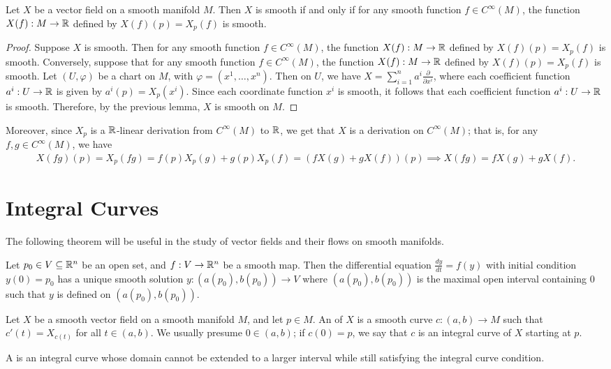 \begin{proposition}
    Let $X$ be a vector field on a smooth manifold $M$. Then $X$ is smooth if and only if for any smooth function $f \in C^{\infty}(M)$, the function $X(f):M \to \mathbb{R}$ defined by $X(f)(p) = X_{p}(f)$ is smooth.
\end{proposition}
\begin{proof}
    Suppose $X$ is smooth. Then for any smooth function $f \in C^{\infty}(M)$, the function $X(f):M \to \mathbb{R}$ defined by $X(f)(p) = X_{p}(f)$ is smooth. Conversely, suppose that for any smooth function $f \in C^{\infty}(M)$, the function $X(f):M \to \mathbb{R}$ defined by $X(f)(p) = X_{p}(f)$ is smooth. Let $(U,\varphi)$ be a chart on $M$, with $\varphi = (x^{1},\ldots,x^{n})$. Then on $U$, we have $X = \sum_{i=1}^{n} a^{i} \frac{\partial}{\partial x^{i}}$, where each coefficient function $a^{i}:U \to \mathbb{R}$ is given by $a^{i}(p) = X_{p}(x^{i})$. Since each coordinate function $x^{i}$ is smooth, it follows that each coefficient function $a^{i}:U \to \mathbb{R}$ is smooth. Therefore, by the previous lemma, $X$ is smooth on $M$.
\end{proof}
Moreover, since $X_{p}$ is a $\mathbb{R}$-linear derivation from $C^{\infty}(M)$ to $\mathbb{R}$, we get that $X$ is a derivation on $C^{\infty}(M)$; that is, for any $f,g \in C^{\infty}(M)$, we have
\begin{align}
    X(fg)(p) = X_{p}(fg) = f(p)X_{p}(g) + g(p)X_{p}(f) = (fX(g) + gX(f))(p) \implies X(fg) = fX(g) + gX(f).
\end{align}


\section{Integral Curves}
The following theorem will be useful in the study of vector fields and their flows on smooth manifolds.
\begin{theorem}
    Let $p_{0} \in V \subseteq \mathbb{R}^{n}$ be an open set, and $f:V \to \mathbb{R}^{n}$ be a smooth map. Then the differential equation $\frac{dy}{dt} = f(y)$ with initial condition $y(0) = p_{0}$ has a unique smooth solution $y:(a(p_{0}),b(p_{0})) \to V$ where $(a(p_{0}),b(p_{0}))$ is the maximal open interval containing $0$ such that $y$ is defined on $(a(p_{0}),b(p_{0}))$.
\end{theorem}

\begin{definition}
    Let $X$ be a smooth vector field on a smooth manifold $M$, and let $p \in M$. An  of $X$ is a smooth curve $c:(a,b) \to M$ such that $c'(t) = X_{c(t)}$ for all $t \in (a,b)$. We usually presume $0 \in (a,b)$; if $c(0) = p$, we say that $c$ is an integral curve of $X$ starting at $p$.

    A  is an integral curve whose domain cannot be extended to a larger interval while still satisfying the integral curve condition. 
\end{definition}

